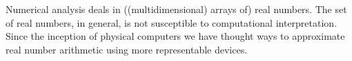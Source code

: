 Numerical analysis deals in ((multidimensional) arrays of) real numbers. The
set of real numbers, in general, is not susceptible to computational
interpretation\cite{turing-1936-7-computability}. Since the inception of
physical computers we have thought ways to approximate real number arithmetic
using more representable devices.




